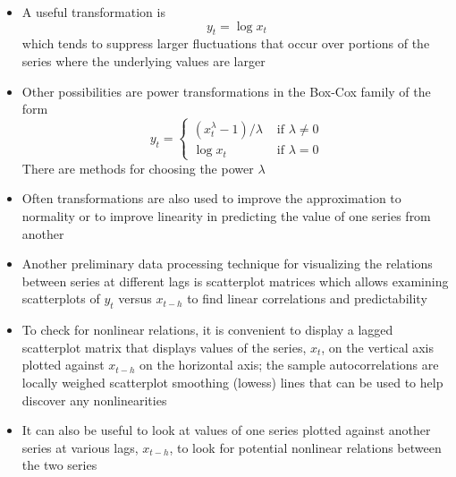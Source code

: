 \documentclass[12pt]{article}
\begin{document}
\begin{itemize}
\item A useful transformation is $$ y_t = \log x_t $$ which tends to suppress larger fluctuations that occur over portions of the series where the underlying values are larger 
\item Other possibilities are power transformations in the Box-Cox family of the form $$ y_t = \begin{cases} (x_t^\lambda - 1) / \lambda &\text{ if } \lambda \neq 0 \\ \log x_t &\text{ if } \lambda = 0 \end{cases} $$ There are methods for choosing the power $\lambda$
\item Often transformations are also used to improve the approximation to normality or to improve linearity in predicting the value of one series from another 
\item Another preliminary data processing technique for visualizing the relations between series at different lags is scatterplot matrices which allows examining scatterplots of $y_t$ versus $x_{t-h}$ to find linear correlations and predictability 
\item To check for nonlinear relations, it is convenient to display a lagged scatterplot matrix that displays values of the series, $x_t$, on the vertical axis plotted against $x_{t-h}$ on the horizontal axis; the sample autocorrelations are locally weighed scatterplot smoothing (lowess) lines that can be used to help discover any nonlinearities
\item It can also be useful to look at values of one series plotted against another series at various lags, $x_{t-h}$, to look for potential nonlinear relations between the two series
\end{itemize}
\end{document}
